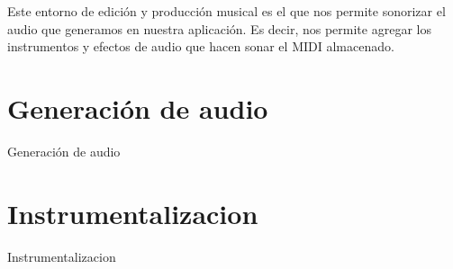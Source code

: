 	Este entorno de edición y producción musical es el que nos permite sonorizar el audio que generamos en nuestra aplicación. Es decir, nos permite agregar los instrumentos y efectos de audio que hacen sonar el MIDI almacenado. 

\section{Generación de audio}
\label{sec:generacionAudio}
	Generación de audio
\section{Instrumentalizacion}
\label{sec:instrumentalizacion}
	Instrumentalizacion
	